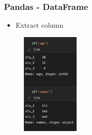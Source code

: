 \begin{frame}\frametitle{Pandas - DataFrame}
   \begin{minipage}{0.48\linewidth}
      \begin{itemize}
         \item Extract column
      \end{itemize}
   \end{minipage}
   \begin{minipage}{0.48\linewidth}
      \begin{figure}[H]
         \includegraphics[width=2.8cm]{../images/illustrations/pandas_get_column.png}
      \end{figure}
   \end{minipage}
\end{frame}


